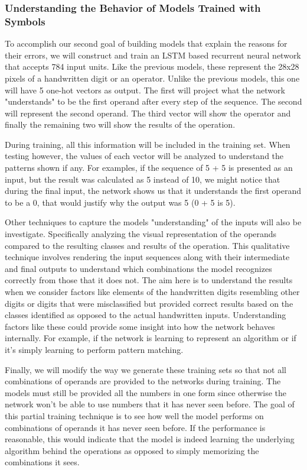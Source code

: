 \documentclass{article}
\begin{document}
	\subsubsection{Understanding the Behavior of Models Trained with Symbols}
	
	To accomplish our second goal of building models that explain the reasons for their errors, we will construct and train an LSTM based recurrent neural network that accepts 784 input units. Like the previous models, these represent the 28x28 pixels of a handwritten digit or an operator. Unlike the previous models, this one will have 5 one-hot vectors as output. The first will project what the network "understands" to be the first operand after every step of the sequence. The second will represent the second operand. The third vector will show the operator and finally the remaining two will show the results of the operation.
	
	During training, all this information will be included in the training set. When testing however, the values of each vector will be analyzed to understand the patterns shown if any. For examples, if the sequence of 5 + 5 is presented as an input, but the result was calculated as 5 instead of 10, we might notice that during the final input, the network shows us that it understands the first operand to be a 0, that would justify why the output was 5 (0 + 5 is 5).
	
	Other techniques to capture the models "understanding" of the inputs will also be investigate. Specifically analyzing the visual representation of the operands compared to the resulting classes and results of the operation. This qualitative technique involves rendering the input sequences along with their intermediate and final outputs to understand which combinations the model recognizes correctly from those that it does not. The aim here is to understand the results when we consider factors like elements of the handwritten digits resembling other digits or digits that were misclassified but provided correct results based on the classes identified as opposed to the actual handwritten inputs. Understanding factors like these could provide some insight into how the network behaves internally. For example, if the network is learning to represent an algorithm or if it's simply learning to perform pattern matching.
	
	Finally, we will modify the way we generate these training sets so that not all combinations of operands are provided to the networks during training. The models must still be provided all the numbers in one form since otherwise the network won't be able to use numbers that it has never seen before. The goal of this partial training technique is to see how well the model performs on combinations of operands it has never seen before. If the performance is reasonable, this would indicate that the model is indeed learning the underlying algorithm behind the operations as opposed to simply memorizing the combinations it sees.
	
\end{document}
